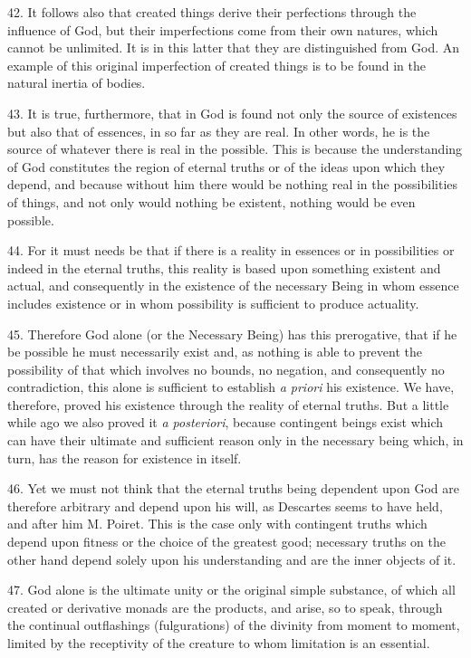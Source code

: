 42. It follows also that created things derive their perfections
through the influence of God, but their imperfections come from their
own natures, which cannot be unlimited. It is in this latter that they
are distinguished from God. An example of this original imperfection
of created things is to be found in the natural inertia of bodies.

43. It is true, furthermore, that in God is found not only
the source of existences but also that of essences, in so far as they
are real. In other words, he is the source of whatever there is real
in the possible. This is because the understanding of God constitutes
the region of eternal truths or of the ideas upon which they depend,
and because without him there would be nothing real in the
possibilities of things, and not only would nothing be existent,
nothing would be even possible.

44. For it must needs be that if there is a reality in essences or in
possibilities or indeed in the eternal truths, this reality is based
upon something existent and actual, and consequently in the existence
of the necessary Being in whom essence includes existence or in whom
possibility is sufficient to produce actuality.

45. Therefore God alone (or the Necessary Being) has this prerogative,
that if he be possible he must necessarily exist and, as nothing is
able to prevent the possibility of that which involves no bounds, no
negation, and consequently no contradiction, this alone is sufficient
to establish \textit{a priori} his existence. We have, therefore,
proved his existence through the reality of eternal truths. But a
little while ago we also proved it \textit{a posteriori}, because
contingent beings exist which can have their ultimate and sufficient
reason only in the necessary being which, in turn, has the reason for
existence in itself.


46. Yet we must not think that the eternal truths being dependent upon
God are therefore arbitrary and depend upon his will, as Descartes
seems to have held, and after him M. Poiret. This is the case only
with contingent truths which depend upon fitness or  the
choice of the greatest good; necessary truths on the other hand depend
solely upon his understanding and are the inner objects of it.

47. God alone is the ultimate unity or the original simple substance,
of which all created or derivative monads are the products, and arise,
so to speak, through the continual outflashings (fulgurations) of the
divinity from moment to moment, limited by the receptivity of the
creature to whom limitation is an essential.

